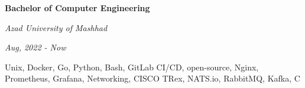 \documentclass{engineercv}
\begin{document}
\begin{minipage}{\textwidth}
  \begin{multicols}{2}
    \begin{minipage}{0.5\textwidth}
      \textbf{Bachelor of Computer Engineering}

      \textit{Azad University of Mashhad}

      \textit{Aug, 2022 - Now}
    \end{minipage}
    \columnbreak
    \begin{minipage}{0.5\textwidth}
      Unix, Docker, Go, Python, Bash, GitLab CI/CD, open-source,
      Nginx, Prometheus, Grafana, Networking, CISCO TRex,
      NATS.io, RabbitMQ, Kafka, C
    \end{minipage}
  \end{multicols}
\end{minipage}
\end{document}
